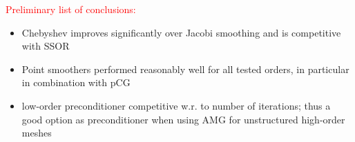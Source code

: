 \documentclass[smallcondensed,final]{svjour3}     %
\newcommand{\todo}[1]{\textcolor{red}{ #1}}
\newcommand{\gsnote}[1]{\textcolor{blue}{GS: #1}}
\begin{document}
\todo{Preliminary list of conclusions:}
\begin{itemize}
\item Chebyshev improves significantly over Jacobi smoothing and is
  competitive with SSOR
\item Point smoothers performed reasonably well for all tested orders,
  in particular in combination with pCG
\item low-order preconditioner competitive w.r. to number of
  iterations; thus a good option as preconditioner when using AMG for
  unstructured high-order meshes

\end{itemize}




\end{document}
